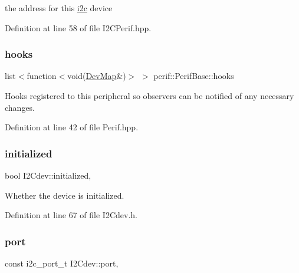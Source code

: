 the address for this \mbox{\hyperlink{namespacei2c}{i2c}} device 

Definition at line 58 of file I2\+C\+Perif.\+hpp.

\mbox{\label{classperif_1_1PerifBase_a98964e5ca8384df64881265e0aa6d7b6}} 
\subsubsection{\texorpdfstring{hooks}{hooks}}
{\footnotesize\ttfamily list$<$function$<$void(\mbox{\hyperlink{Perif_8hpp_a358ff4ee6d24694ee7661f0cce14377e}{Dev\+Map}}\&)$>$ $>$ perif\+::\+Perif\+Base\+::hooks\hspace{0.3cm}{\ttfamily [inherited]}}

Hooks registered to this peripheral so observers can be notified of any necessary changes. 

Definition at line 42 of file Perif.\+hpp.

\mbox{\label{classI2Cdev_a94b914bfcbd0fe1f6fdd7b9c6f4ab921}} 
\subsubsection{\texorpdfstring{initialized}{initialized}}
{\footnotesize\ttfamily bool I2\+Cdev\+::initialized\hspace{0.3cm}{\ttfamily [protected]}, {\ttfamily [inherited]}}

Whether the device is initialized. 

Definition at line 67 of file I2\+Cdev.\+h.

\mbox{\label{classI2Cdev_a1d1e63732aa9f50369172b27a034129c}} 
\subsubsection{\texorpdfstring{port}{port}}
{\footnotesize\ttfamily const i2c\+\_\+port\+\_\+t I2\+Cdev\+::port\hspace{0.3cm}{\ttfamily [protected]}, {\ttfamily [inherited]}}

